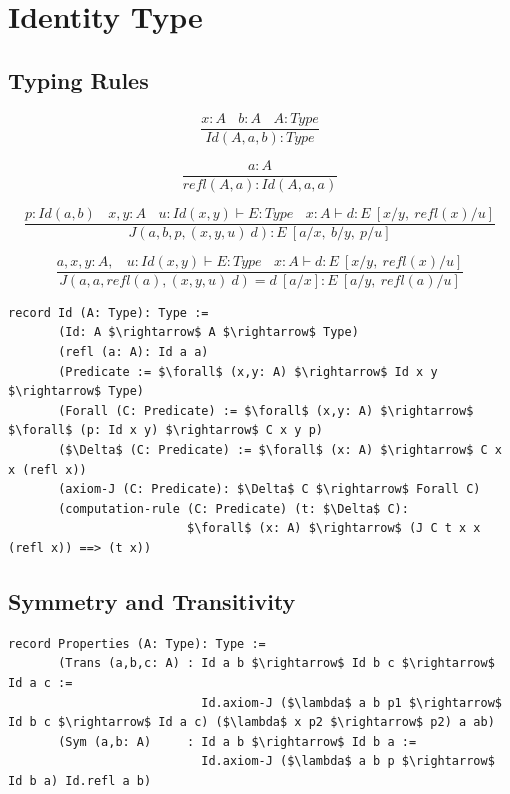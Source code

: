 \documentclass[11pt,oneside]{article}
\begin{document}
\section{Identity Type}

\subsection{Typing Rules}

\begin{equation}
\tag{$Id$-formation}
\dfrac
  {x:A\ \ \ \ b:A\ \ \ \ A:Type}
  {Id(A,a,b) : Type}
\end{equation}

\begin{equation}
\tag{$Id$-intro}
\dfrac
  {a:A}
  {refl(A,a) : Id(A,a,a) }
\end{equation}

\begin{equation}
\tag{$J$-elimination}
\dfrac
  {p:Id(a,b)\ \ \ \ x,y:A\ \ \ \ u:Id(x,y) \vdash E:Type\ \ \ \ x:A \vdash d: E\ [x/y,\ refl(x)/u]}
  {J(a,b,p,(x,y,u)\ d) : E\ [a/x,\ b/y,\ p/u]}
\end{equation}

\begin{equation}
\tag{$Id$-computation}
\dfrac
  {a,x,y:A,\ \ \ \ u:Id(x,y) \vdash E:Type\ \ \ \ x:A \vdash d:E\ [x/y,\ refl(x)/u]}
  {J(a,a,refl(a),(x,y,u)\ d) = d\ [a/x] : E\ [a/y,\ refl(a)/u]}
\end{equation}

\begin{lstlisting}[mathescape=true]
record Id (A: Type): Type :=
       (Id: A $\rightarrow$ A $\rightarrow$ Type)
       (refl (a: A): Id a a)
       (Predicate := $\forall$ (x,y: A) $\rightarrow$ Id x y $\rightarrow$ Type)
       (Forall (C: Predicate) := $\forall$ (x,y: A) $\rightarrow$ $\forall$ (p: Id x y) $\rightarrow$ C x y p)
       ($\Delta$ (C: Predicate) := $\forall$ (x: A) $\rightarrow$ C x x (refl x))
       (axiom-J (C: Predicate): $\Delta$ C $\rightarrow$ Forall C)
       (computation-rule (C: Predicate) (t: $\Delta$ C):
                         $\forall$ (x: A) $\rightarrow$ (J C t x x (refl x)) ==> (t x))
\end{lstlisting}

\newpage
\subsection{Symmetry and Transitivity}

\begin{lstlisting}[mathescape=true]
record Properties (A: Type): Type :=
       (Trans (a,b,c: A) : Id a b $\rightarrow$ Id b c $\rightarrow$ Id a c :=
                           Id.axiom-J ($\lambda$ a b p1 $\rightarrow$ Id b c $\rightarrow$ Id a c) ($\lambda$ x p2 $\rightarrow$ p2) a ab)
       (Sym (a,b: A)     : Id a b $\rightarrow$ Id b a :=
                           Id.axiom-J ($\lambda$ a b p $\rightarrow$ Id b a) Id.refl a b)
\end{lstlisting}
\end{document}
